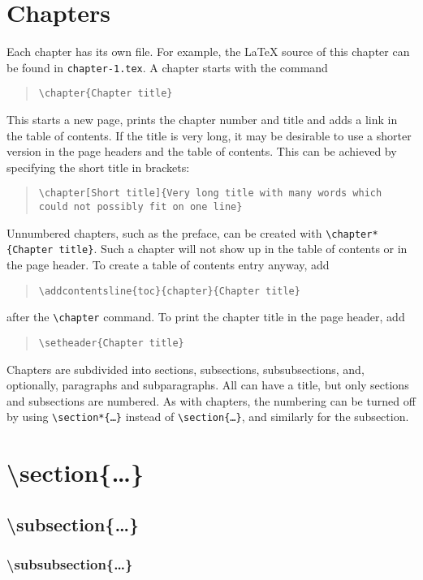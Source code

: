 \section{Chapters}
Each chapter has its own file. For example, the \LaTeX{} source of this chapter can be found in \texttt{chapter-1.tex}. A chapter starts with the command
\begin{quote}
\texttt{\textbackslash chapter\{Chapter title\}}
\end{quote}
This starts a new page, prints the chapter number and title and adds a link in the table of contents. If the title is very long, it may be desirable to use a shorter version in the page headers and the table of contents. This can be achieved by specifying the short title in brackets:
\begin{quote}
\texttt{\textbackslash chapter[Short title]\{Very long title with many words which could not possibly fit on one line\}}
\end{quote}
Unnumbered chapters, such as the preface, can be created with \texttt{\textbackslash chapter*\{Chapter title\}}. Such a chapter will not show up in the table of contents or in the page header. To create a table of contents entry anyway, add
\begin{quote}
    \texttt{\textbackslash addcontentsline\{toc\}\{chapter\}\{Chapter title\}}
\end{quote}
after the \texttt{\textbackslash chapter} command. To print the chapter title in the page header, add
\begin{quote}
    \texttt{\textbackslash setheader\{Chapter title\}}
\end{quote}
\noindent Chapters are subdivided into sections, subsections, subsubsections, and, optionally, paragraphs and subparagraphs. All can have a title, but only sections and subsections are numbered. As with chapters, the numbering can be turned off by using \texttt{\textbackslash section*\{\ldots\}} instead of \texttt{\textbackslash section\{\ldots\}}, and similarly for the subsection.
\section{\textbackslash section\{\ldots\}}
\subsection{\textbackslash subsection\{\ldots\}}
\subsubsection{\textbackslash subsubsection\{\ldots\}}
